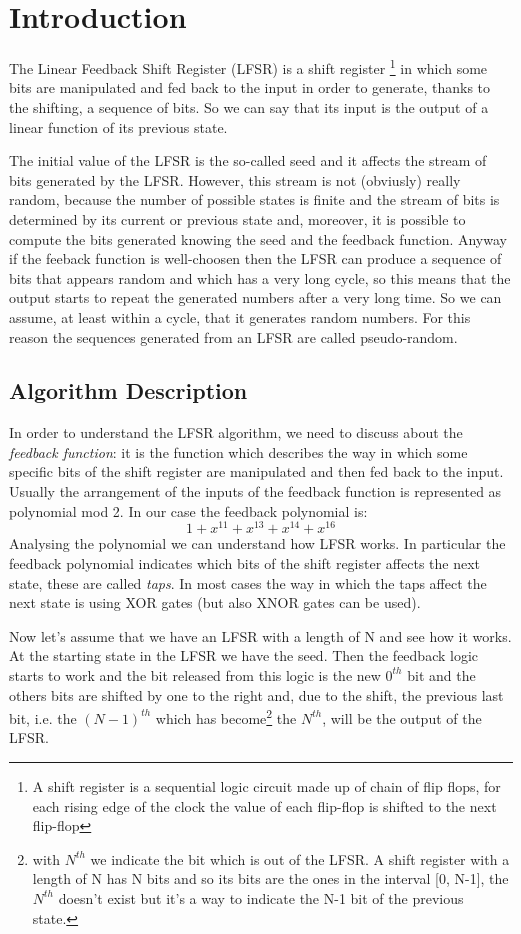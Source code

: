 \documentclass[a4paper]{report}
\begin{document}
\chapter{Introduction}
The Linear Feedback Shift Register (LFSR) is a shift register \footnote{A shift register is a sequential logic circuit made up of  chain of flip flops, for each rising edge of the clock the value of each flip-flop is shifted to the next flip-flop} in which some bits are manipulated and fed back to the input in order to generate, thanks to the shifting, a sequence of bits. So we can say that its input is the output of a linear function of its previous state.

\noindent The initial value of the LFSR is the so-called seed and it affects the stream of bits generated by the LFSR. However, this stream is not (obviusly) really random, because the number of possible states is finite and the stream of bits is determined by its current or previous state and, moreover, it is possible to compute the bits generated knowing the seed and the feedback function.
\noindent Anyway if the feeback function is well-choosen then the LFSR can produce a sequence of bits that appears random and which has a very long cycle, so this means that the output starts to repeat the generated numbers after a very long time. So we can assume, at least within a cycle, that it generates random numbers. For this reason the sequences generated from an LFSR are called pseudo-random.

\section{Algorithm Description}
In order to understand the LFSR algorithm, we need to discuss about the \emph{feedback function}: it is the function which describes the way in which some specific bits of the shift register are manipulated and then fed back to the input. Usually the arrangement of the inputs of the feedback function is represented as polynomial mod 2. In our case the feedback polynomial is:
\[1+x^{11}+x^{13}+x^{14}+x^{16}\]
Analysing the polynomial we can understand how LFSR works. In particular the feedback polynomial indicates which bits of the shift register affects the next state, these are called \emph{taps}.
In most cases the way in which the taps affect the next state is using XOR gates (but also XNOR gates can be used).

\noindent Now let's assume that we have an LFSR with a length of N and see how it works. At the starting state in the LFSR we have the seed. Then the feedback logic starts to work and the bit released from this logic is the new $0^{th}$ bit and the others bits are shifted by one to the right and, due to the shift, the previous last bit, i.e. the $(N-1)^{th}$ which has become\footnote{with $N^{th}$ we indicate the bit which is out of the LFSR. A shift register with a length of N has N bits and so its bits are the ones in the interval [0, N-1], the  $N^{th}$ doesn't exist but it's a way to indicate the N-1 bit of the previous state.} the $N^{th}$, will be the output of the LFSR.
\end{document}
